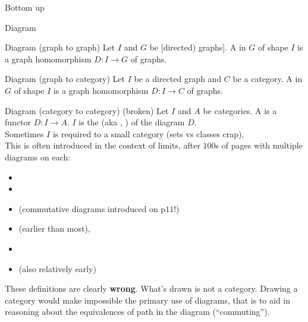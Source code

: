 \begin{plSection}{Bottom up}
\begin{plSection}{Diagram}
\begin{plDefinition}{Diagram (graph to graph)
\textmd{
}}
{}
Let $I$ and $G$ be {[directed) graphs]}.
A  in $G$ of shape $I$
is a graph homomorphism $D : I \rightarrow G$ of graphs.
\end{plDefinition}

\begin{plDefinition}{Diagram (graph to category)
\textmd{
}}
{}
Let $I$ be a directed graph
 and $C$ be a category.
A  in $G$ of shape $I$
is a graph homomorphism $D : I \rightarrow C$ of graphs.
\end{plDefinition}

\begin{plDefinition}{Diagram (category to category)
 \textmd{(broken)}}
{}
\label{def:diagram_cat_to_cat}
Let $I$ and $A$ be categories.
A  is a functor $D : I \rightarrow A$.
$I$ is the  (aka ,
) of the diagram $D$.\\
Sometimes $I$ is required to a small category
(sets vs classes crap).\\
This is often introduced in the context of limits,
after $100$s of pages
with multiple diagrams on each:
\begin{itemize}
\item {}
\item {}
\item {}
(commutative diagrams introduced on p$11$!)
\item {}
 (earlier than most),
\item {}
\item {} (also relatively early)
\end{itemize}
These definitions are clearly \textbf{wrong}.
What's drawn is not a category.
Drawing a category would make impossible the primary use of diagrams,
that is to aid in reasoning
about the equivalences of path in the diagram (``commuting'').
\end{plDefinition}


\end{plSection}
\end{plSection}
